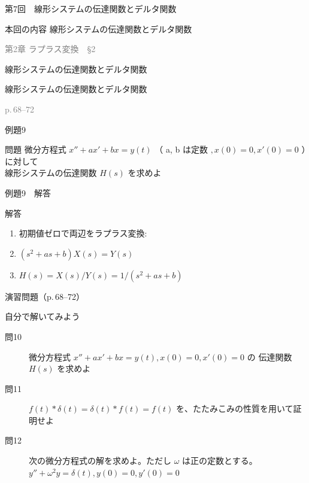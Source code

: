 \documentclass[aspectratio=43,professionalfonts,handout]{beamer}
\begin{document}
\begin{frame}{第7回　線形システムの伝達関数とデルタ関数}
  \begin{block}{本回の内容}
  線形システムの伝達関数とデルタ関数
  \end{block}
  \vfill\hfill{\scriptsize \textcolor{gray}{第2章 ラプラス変換　§2}}
\end{frame}

\begin{frame}{線形システムの伝達関数とデルタ関数}
  \begin{block}{}
  {\large 線形システムの伝達関数とデルタ関数}
  \end{block}
  \vfill\hfill{\scriptsize \textcolor{gray}{p.\,68--72}}
\end{frame}

\begin{frame}{例題9}
  \begin{exampleblock}{問題}
    微分方程式 $x'' + ax' + bx = y(t)$ （ a, b は定数 $, x(0)=0, x'(0)=0$ ）に対して\\[2pt]
    線形システムの伝達関数 $H(s)$ を求めよ\\[2pt]
  \end{exampleblock}
\end{frame}

\begin{frame}{例題9　解答}
  \begin{exampleblock}{解答}
  \begin{enumerate}[1.]
    \item[] 初期値ゼロで両辺をラプラス変換:
    \item[] $(s^{2}+as+b)X(s) = Y(s)$
    \item[] $H(s) = X(s)/Y(s) = 1/(s^{2}+as+b)$
  \end{enumerate}
  \end{exampleblock}
\end{frame}

\begin{frame}{演習問題（p.\,68--72）}
  \begin{exampleblock}{自分で解いてみよう}
  \begin{description}
    \item[問10] 微分方程式 $x'' + ax' + bx = y(t), x(0)=0, x'(0)=0$ の
    伝達関数 $H(s)$ を求めよ\\
    \item[問11] $f(t)*\delta(t) = \delta(t)*f(t) = f(t)$ を、たたみこみの性質を用いて証明せよ
    \item[問12] 次の微分方程式の解を求めよ。ただし $\omega$ は正の定数とする。
    $y'' + \omega^{2}y = \delta(t),  y(0) = 0,  y'(0) = 0$\\
  \end{description}
  \end{exampleblock}
\end{frame}
\end{document}
